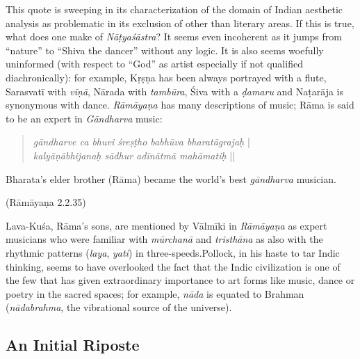 This quote is sweeping in its characterization of the domain of Indian aesthetic analysis as problematic in its exclusion of other than literary areas. If this is true, what does one make of \textsl{Nāṭyaśāstra}? It seems even incoherent as it jumps from “nature” to “Shiva the dancer” without any logic. It is also seems woefully uninformed (with respect to “God” as artist especially if not qualified diachronically): for example, Kṛṣṇa has been always portrayed with a flute, Sarasvatī with \textsl{vīṇā}, Nārada with \textsl{tambūra}, Śiva with a \textsl{ḍamaru} and Naṭarāja is synonymous with dance. \textsl{Rāmāyaṇa} has many descriptions of music; Rāma is said to be an expert in \textsl{Gāndharva} music:

\begin{quote}
\textsl{gāndharve ca bhuvi śreṣṭho babhūva bharatāgrajaḥ} |\\
\textsl{kalyāṇābhijanaḥ sādhur adīnātmā mahāmatiḥ} ||
\end{quote}

\begin{myquote}
Bharata’s elder brother (Rāma) became the world’s best \textsl{gāndharva} musician. 

\hfill(Rāmāyaṇa 2.2.35)
\end{myquote}

Lava-Kuśa, Rāma’s sons, are mentioned by Vālmīki in \textsl{Rāmāyaṇa} as expert musicians who were familiar with \textsl{mūrchanā} and \textsl{tristhāna} as also with the rhythmic patterns (\textsl{laya}, \textsl{yati}) in three-speeds.Pollock, in his haste to tar Indic thinking, seems to have overlooked the fact that the Indic civilization is one of the few that has given extraordinary importance to art forms like music, dance or poetry in the sacred spaces; for example, \textsl{nāda} is equated to Brahman (\textsl{nādabrahma}, the vibrational source of the universe).

\subsection{An Initial Riposte}\label{chap7-sec1.1}

